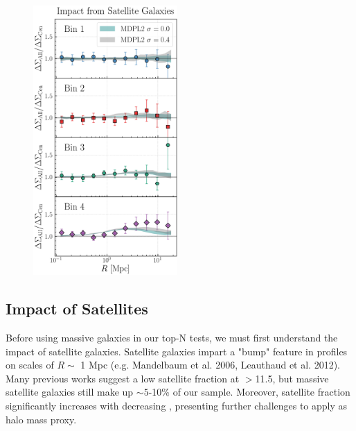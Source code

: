 \documentclass[a4paper,fleqn,usenatbib]{mnras}
\begin{document}
  \begin{figure}
      \centering
      \includegraphics[width=0.49\textwidth]{figure/dsigma_sat_ratio}
      \caption{
          }
      \label{fig:satellite}
  \end{figure}

\subsection{Impact of Satellites}
    \label{sec:satellite}

Before using massive galaxies in our top-N tests, we must first understand the impact of  satellite galaxies.        Satellite galaxies impart a "bump" feature in \dsigma{} profiles on scales of $R\sim$ 1 Mpc (e.g. Mandelbaum et al. 2006, Leauthaud et al. 2012).
            Many previous works suggest a low satellite fraction at \logms{}$>$11.5, but
            massive satellite galaxies still make up $\sim 5$-10\% of our sample.
            Moreover, satellite fraction significantly increases with decreasing \mstar{},
            presenting further challenges to apply \mstar{} as halo mass proxy.
\end{document}
